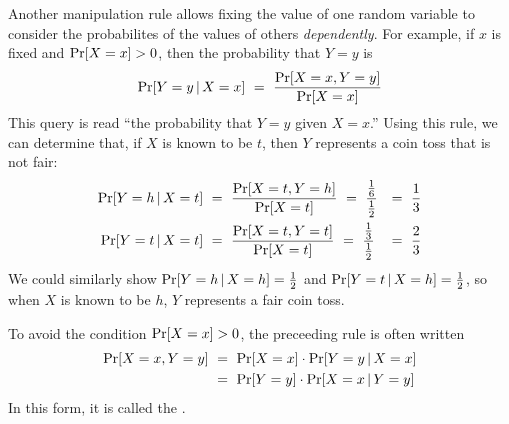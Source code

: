 Another manipulation rule allows fixing the value of one random variable to consider the probabilites of the values of others \emph{dependently}.
For example, if $x$ is fixed and $\mathrm{Pr}\!\left[{X = x}\right] > 0$, then the probability that $Y = y$ is
\begin{equation}
	\Pspec{Y = y \given X = x}\ =\ \frac{\Pspec{X = x,Y = y}}{\Pspec{X = x}}
\end{equation}
This  query is read ``the probability that $Y = y$ given $X = x$.''
Using this rule, we can determine that, if $X$ is known to be $t$, then $Y$ represents a coin toss that is not fair:
\begin{equation}
\begin{aligned}
	\Pspec{Y = h \given X = t}&\ =\ \frac{\Pspec{X = t,Y = h}}{\Pspec{X = t}}\ =\ \frac{\frac{1}{6}}{\frac{1}{2}}&=\ \frac{1}{3}
\\
	\Pspec{Y = t \given X = t}&\ =\ \frac{\Pspec{X = t,Y = t}}{\Pspec{X = t}}\ =\ \frac{\frac{1}{3}}{\frac{1}{2}}&=\ \frac{2}{3}
\end{aligned}
\end{equation}
We could similarly show $\mathrm{Pr}\!\left[{Y = h \,|\, X = h}\right] = \frac{1}{2}$ and $\mathrm{Pr}\!\left[{Y = t \,|\, X = h}\right] = \frac{1}{2}$, so when $X$ is known to be $h$, $Y$ represents a fair coin toss.

To avoid the condition $\mathrm{Pr}\!\left[{X = x}\right] > 0$, the preceeding rule is often written
\begin{equation}
\begin{aligned}
	\mathrm{Pr}\!\left[{X = x, Y = y}\right]&\ =\ \mathrm{Pr}\!\left[{X = x}\right] \cdot \mathrm{Pr}\!\left[{Y = y \,|\, X = x}\right] \\
	&\ =\ \mathrm{Pr}\!\left[{Y = y}\right] \cdot \mathrm{Pr}\!\left[{X = x \,|\, Y = y}\right]
\end{aligned}
\end{equation}
In this form, it is called the .

